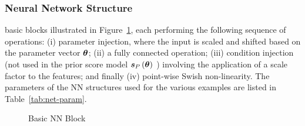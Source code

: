 \subsubsection{Neural Network Structure}
basic blocks {%
illustrated in Figure~\ref{fig:basic_block}, each performing the following sequence of operations:}
(i) parameter injection, %
where the input is scaled and shifted based on the parameter vector $\bm{\theta}$; 
(ii) a fully connected operation; 
(iii) condition injection (not used in the prior score model $\bm{s}_{P}\left(\bm{\theta}\right)$ ) involving the application of a scale factor to the features; and finally (iv) %
point-wise Swish \cite{ramachandran2017searching} non-linearity.
{The parameters of the NN structures used for the various examples are listed in Table~\ref{tab:net-param}.}
\begin{figure}
    \centering
    
    \caption{Basic NN Block}
    \label{fig:basic_block}
\end{figure}
